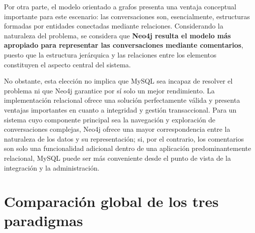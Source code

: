 \documentclass[11pt, a4paper]{article}
\begin{document}
Por otra parte, el modelo orientado a grafos presenta una ventaja conceptual importante para este escenario: las conversaciones son, esencialmente, estructuras formadas por entidades conectadas mediante relaciones. Considerando la naturaleza del problema, se considera que \textbf{Neo4j resulta el modelo más apropiado para representar las conversaciones mediante comentarios}, puesto que la estructura jerárquica y las relaciones entre los elementos constituyen el aspecto central del sistema.

No obstante, esta elección no implica que MySQL sea incapaz de resolver el problema ni que Neo4j garantice por sí solo un mejor rendimiento. La implementación relacional ofrece una solución perfectamente válida y presenta ventajas importantes en cuanto a integridad y gestión transaccional. Para un sistema cuyo componente principal sea la navegación y exploración de conversaciones complejas, Neo4j ofrece una mayor correspondencia entre la naturaleza de los datos y su representación; si, por el contrario, los comentarios son solo una funcionalidad adicional dentro de una aplicación predominantemente relacional, MySQL puede ser más conveniente desde el punto de vista de la integración y la administración.

\section{Comparación global de los tres paradigmas}\label{sec:comp}
\end{document}
